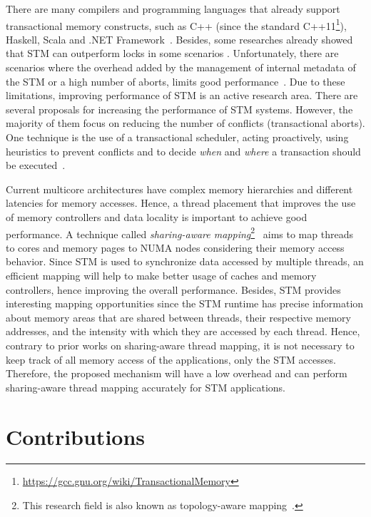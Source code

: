 There are many compilers and programming languages that already support transactional memory constructs, such as C++ (since the standard C++11\footnote{\url{https://gcc.gnu.org/wiki/TransactionalMemory}}), Haskell, Scala and .NET Framework~\cite{Gramoli:2017}. Besides, some researches already showed that STM can outperform locks in some scenarios \cite{Dice:2007, STMNOTToy}. Unfortunately, there are scenarios where the overhead added by the management of internal metadata of the STM or a high number of aborts, limits good performance~\cite{Gramoli:2014}. Due to these limitations, improving performance of STM is an active research area. 
There are several proposals for increasing the performance of STM systems. However, the majority of them focus on reducing the number of conflicts (transactional aborts). One technique is the use of a transactional scheduler, acting proactively, using heuristics to prevent conflicts and to decide \emph{when} and \emph{where} a transaction should be executed~\cite{Sanzo:2017}.

Current multicore architectures have complex memory hierarchies and different latencies for memory accesses. Hence, a thread placement that improves the use of memory controllers and data locality is important to achieve good performance. A technique called \emph{sharing-aware mapping}\footnote{This research field is also known as topology-aware mapping~\cite{Jeannot:2013,Unat:2017}.}~\cite{Cruz:2018} aims to map threads to cores and memory pages to NUMA nodes considering their memory access behavior. Since STM is used to synchronize data accessed by multiple threads, an efficient mapping will help to make better usage of caches and memory controllers, hence improving the overall performance. Besides, STM provides interesting mapping opportunities since the STM runtime has precise information about memory areas that are shared between threads, their respective memory addresses, and the intensity with which they are accessed by each thread. Hence, contrary to prior works on sharing-aware thread mapping, it is not necessary to keep track of all memory access of the applications, only the STM accesses. Therefore, the proposed mechanism will have a low overhead and can perform sharing-aware thread mapping accurately for STM applications.


\section{Contributions}

